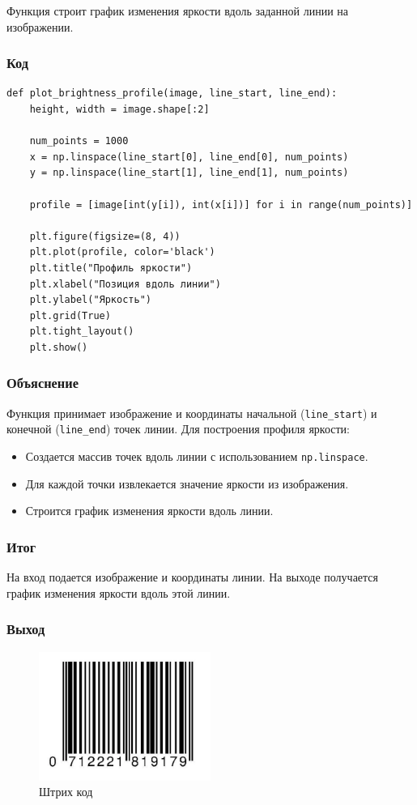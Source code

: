 \documentclass[a4paper,12pt]{article}
\begin{document}
Функция строит график изменения яркости вдоль заданной линии на изображении.

\subsubsection{Код}
\begin{verbatim}
def plot_brightness_profile(image, line_start, line_end):
    height, width = image.shape[:2]
    
    num_points = 1000
    x = np.linspace(line_start[0], line_end[0], num_points)
    y = np.linspace(line_start[1], line_end[1], num_points)

    profile = [image[int(y[i]), int(x[i])] for i in range(num_points)]

    plt.figure(figsize=(8, 4))
    plt.plot(profile, color='black')
    plt.title("Профиль яркости")
    plt.xlabel("Позиция вдоль линии")
    plt.ylabel("Яркость")
    plt.grid(True)
    plt.tight_layout()
    plt.show()
\end{verbatim}

\subsubsection{Объяснение}
Функция принимает изображение и координаты начальной (\texttt{line\_start}) и конечной (\texttt{line\_end}) точек линии. Для построения профиля яркости:
\begin{itemize}
    \item Создается массив точек вдоль линии с использованием \texttt{np.linspace}.
    \item Для каждой точки извлекается значение яркости из изображения.
    \item Строится график изменения яркости вдоль линии.
\end{itemize}

\subsubsection{Итог}
На вход подается изображение и координаты линии. На выходе получается график изменения яркости вдоль этой линии.

\subsubsection{Выход}


\begin{figure}[H]
    \centering
    \includegraphics[width=0.5\textwidth]{im/imШтрих.png}
    \caption{Штрих код}
    \label{fig:brightness_profile}
\end{figure}
\end{document}
